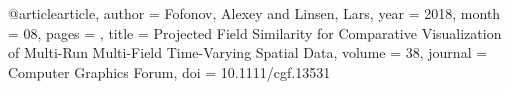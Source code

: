 @article{article,
author = {Fofonov, Alexey and Linsen, Lars},
year = {2018},
month = {08},
pages = {},
title = {Projected Field Similarity for Comparative Visualization of Multi-Run Multi-Field Time-Varying Spatial Data},
volume = {38},
journal = {Computer Graphics Forum},
doi = {10.1111/cgf.13531}
}